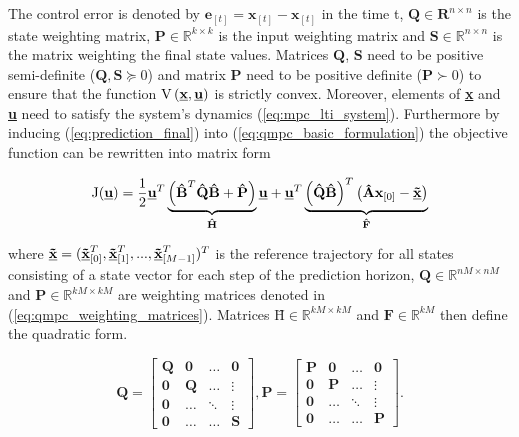 The control error is denoted by $\textbf{e}_{[t]} = \textbf{x}_{[t]} - \textbf{\~x}_{[t]}$ in the time t, $\textbf{Q} \in \textbf{R}^{n\times n}$ is the state weighting matrix, $\textbf{P} \in \mathbb{R}^{k\times k}$ is the input weighting matrix and $\textbf{S} \in \mathbb{R}^{n \times n}$ is the matrix weighting the final state values. Matrices $\textbf{Q}$, $\textbf{S}$ need to be positive semi-definite ($\textbf{Q}, \textbf{S} \succeq 0$) and matrix $\textbf{P}$ need to be positive definite ($\textbf{P} \succ 0$) to ensure that the function $\mathrm{V}\left(\textbf{\underline{x}}, \textbf{\underline{u}}\right)$ is strictly convex. Moreover, elements of \textbf{\underline{x}} and \textbf{\underline{u}} need to satisfy the system's dynamics (\ref{eq:mpc_lti_system}). Furthermore by inducing (\ref{eq:prediction_final}) into (\ref{eq:qmpc_basic_formulation}) the objective function can be rewritten into matrix form


\begin{equation}
\mathrm{J}(\underline{\textbf{u}}) = \frac{1}{2}\textbf{\underline{u}}^T\underbrace{\left(\textbf{\^B}^T\textbf{\^Q}\textbf{\^B} + \textbf{\^P}\right)}_{\textbf{\^H}}\textbf{\underline{u}} + \textbf{\underline{u}}^T\underbrace{\left(\textbf{\^Q}\textbf{\^B}\right)^T\left(\textbf{\^A}\textbf{x}_{[0]} - \textbf{\underline{\~x}}\right)}_{\textbf{\^F}}
\end{equation}

where $\textbf{\underline{\~x}} = (\textbf{\underline{\~x}}_{[0]}^T, \textbf{\underline{\~x}}_{[1]}^T, ..., \textbf{\underline{\~x}}_{[M-1]}^T)^T$ is the reference trajectory for all states consisting of a state vector for each step of the prediction horizon, \mbox{$\textbf{\^Q} \in \mathbb{R}^{nM \times nM}$} and $\textbf{\^P} \in \mathbb{R}^{kM\times kM}$ are weighting matrices denoted in (\ref{eq:qmpc_weighting_matrices}). Matrices $\textbf{\^H} \in \mathbb{R}^{kM\times kM}$ and $\textbf{\^F} \in \mathbb{R}^{kM}$ then define the quadratic form. 

\begin{equation}
\label{eq:qmpc_weighting_matrices}
\textbf{\^Q} = \begin{bmatrix}
\textbf{Q} & \textbf{0} & \hdots & \textbf{0} \\
\textbf{0} & \textbf{Q} & \hdots & \vdots \\
\textbf{0} & \hdots & \ddots & \vdots \\
\textbf{0} & \hdots & \hdots & \textbf{S}
\end{bmatrix},
\textbf{\^P} = \begin{bmatrix}
\textbf{P} & \textbf{0} & \hdots & \textbf{0} \\
\textbf{0} & \textbf{P} & \hdots & \vdots \\
\textbf{0} & \hdots & \ddots & \vdots \\
\textbf{0} & \hdots & \hdots & \textbf{P}
\end{bmatrix}.
\end{equation}

